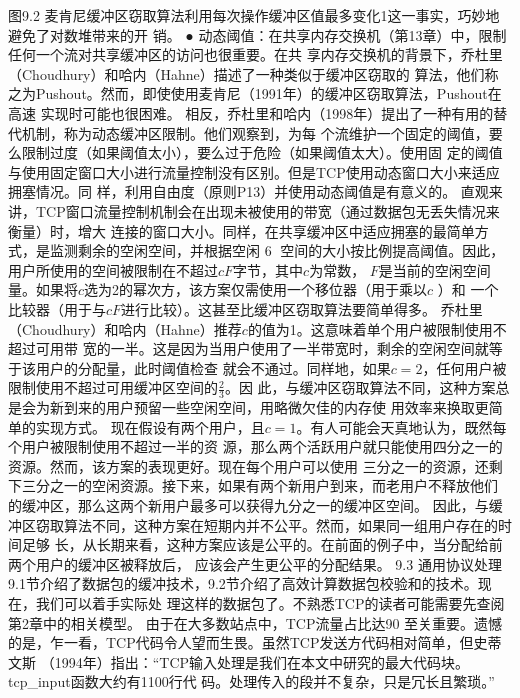图9.2 麦肯尼缓冲区窃取算法利用每次操作缓冲区值最多变化1这一事实，巧妙地避免了对数堆带来的开
销。
 ● 动态阈值：在共享内存交换机（第13章）中，限制任何一个流对共享缓冲区的访问也很重要。在共
   享内存交换机的背景下，乔杜里（Choudhury）和哈内（Hahne）描述了一种类似于缓冲区窃取的
   算法，他们称之为Pushout。然而，即使使用麦肯尼（1991年）的缓冲区窃取算法，Pushout在高速
   实现时可能也很困难。
相反，乔杜里和哈内（1998年）提出了一种有用的替代机制，称为动态缓冲区限制。他们观察到，为每
个流维护一个固定的阈值，要么限制过度（如果阈值太小），要么过于危险（如果阈值太大）。使用固
定的阈值与使用固定窗口大小进行流量控制没有区别。但是TCP使用动态窗口大小来适应拥塞情况。同
样，利用自由度（原则P13）并使用动态阈值是有意义的。
直观来讲，TCP窗口流量控制机制会在出现未被使用的带宽（通过数据包无丢失情况来衡量）时，增大
连接的窗口大小。同样，在共享缓冲区中适应拥塞的最简单方式，是监测剩余的空闲空间，并根据空闲
                                                          6
空间的大小按比例提高阈值。因此，用户所使用的空间被限制在不超过$cF$字节，其中$c$为常数，
$F$是当前的空闲空间量。如果将$c$选为2的幂次方，该方案仅需使用一个移位器（用于乘以$c$ ）和
一个比较器（用于与$cF$进行比较）。这甚至比缓冲区窃取算法要简单得多。
乔杜里（Choudhury）和哈内（Hahne）推荐$c$的值为1。这意味着单个用户被限制使用不超过可用带
宽的一半。这是因为当用户使用了一半带宽时，剩余的空闲空间就等于该用户的分配量，此时阈值检查
就会不通过。同样地，如果$c = 2$，任何用户被限制使用不超过可用缓冲区空间的$\frac{2}{3}$。因
此，与缓冲区窃取算法不同，这种方案总是会为新到来的用户预留一些空闲空间，用略微欠佳的内存使
用效率来换取更简单的实现方式。
现在假设有两个用户，且\(c = 1\)。有人可能会天真地认为，既然每个用户被限制使用不超过一半的资
源，那么两个活跃用户就只能使用四分之一的资源。然而，该方案的表现更好。现在每个用户可以使用
三分之一的资源，还剩下三分之一的空闲资源。接下来，如果有两个新用户到来，而老用户不释放他们
的缓冲区，那么这两个新用户最多可以获得九分之一的缓冲区空间。
因此，与缓冲区窃取算法不同，这种方案在短期内并不公平。然而，如果同一组用户存在的时间足够
长，从长期来看，这种方案应该是公平的。在前面的例子中，当分配给前两个用户的缓冲区被释放后，
应该会产生更公平的分配结果。
9.3 通用协议处理
9.1节介绍了数据包的缓冲技术，9.2节介绍了高效计算数据包校验和的技术。现在，我们可以着手实际处
理这样的数据包了。不熟悉TCP的读者可能需要先查阅第2章中的相关模型。
由于在大多数站点中，TCP流量占比达90%
至关重要。遗憾的是，乍一看，TCP代码令人望而生畏。虽然TCP发送方代码相对简单，但史蒂文斯
（1994年）指出：“TCP输入处理是我们在本文中研究的最大代码块。tcp_input函数大约有1100行代
码。处理传入的段并不复杂，只是冗长且繁琐。”
